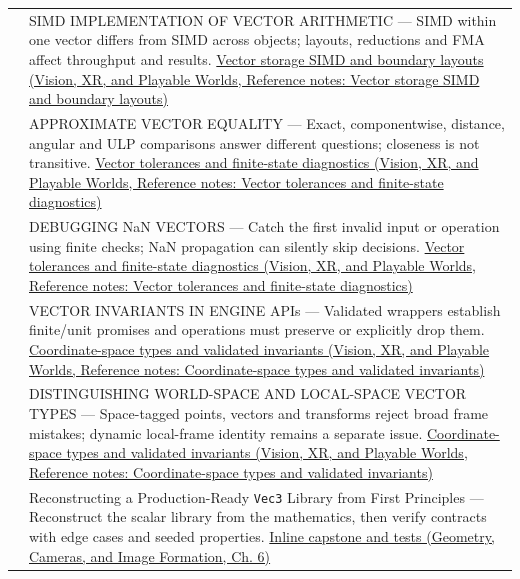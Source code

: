 {\begin{longtable}[]{@{}
  >{\raggedright\arraybackslash}p{}
  >{\raggedright\arraybackslash}p{}@{}}
595 & SIMD IMPLEMENTATION OF VECTOR ARITHMETIC --- SIMD within one vector differs from SIMD across objects; layouts, reductions and FMA affect throughput and results. \href{../07-Vision-XR-and-Playable-Worlds/main.pdf\#nameddest=appendix-26bf6bf2fb8b}{Vector storage SIMD and boundary layouts (Vision, XR, and Playable Worlds, Reference notes: Vector storage SIMD and boundary layouts)} \\
596 & APPROXIMATE VECTOR EQUALITY --- Exact, componentwise, distance, angular and ULP comparisons answer different questions; closeness is not transitive. \href{../07-Vision-XR-and-Playable-Worlds/main.pdf\#nameddest=appendix-b5b83329215b}{Vector tolerances and finite-state diagnostics (Vision, XR, and Playable Worlds, Reference notes: Vector tolerances and finite-state diagnostics)} \\
597 & DEBUGGING NaN VECTORS --- Catch the first invalid input or operation using finite checks; NaN propagation can silently skip decisions. \href{../07-Vision-XR-and-Playable-Worlds/main.pdf\#nameddest=appendix-b5b83329215b}{Vector tolerances and finite-state diagnostics (Vision, XR, and Playable Worlds, Reference notes: Vector tolerances and finite-state diagnostics)} \\
598 & VECTOR INVARIANTS IN ENGINE APIs --- Validated wrappers establish finite/unit promises and operations must preserve or explicitly drop them. \href{../07-Vision-XR-and-Playable-Worlds/main.pdf\#nameddest=appendix-380a220e2529}{Coordinate-space types and validated invariants (Vision, XR, and Playable Worlds, Reference notes: Coordinate-space types and validated invariants)} \\
599 & DISTINGUISHING WORLD-SPACE AND LOCAL-SPACE VECTOR TYPES --- Space-tagged points, vectors and transforms reject broad frame mistakes; dynamic local-frame identity remains a separate issue. \href{../07-Vision-XR-and-Playable-Worlds/main.pdf\#nameddest=appendix-380a220e2529}{Coordinate-space types and validated invariants (Vision, XR, and Playable Worlds, Reference notes: Coordinate-space types and validated invariants)} \\
600 & Reconstructing a Production-Ready \texttt{Vec3} Library from First Principles --- Reconstruct the scalar library from the mathematics, then verify contracts with edge cases and seeded properties. \href{../03-Geometry-Cameras-and-Image-Formation/main.pdf\#nameddest=02-foundations-ii-ch037-a-complete-scalar-laboratory-makes-the-story-executable}{Inline capstone and tests (Geometry, Cameras, and Image Formation, Ch. 6)} \\
\end{longtable}
}

